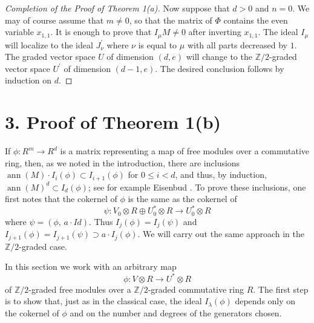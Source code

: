 \documentclass{tran-l}
\theoremstyle{plain}
\theoremstyle{remark}
\theoremstyle{definition}
\newcommand{\ann}{\operatorname{ann}}
\newcommand{\ZZ}{\mathbb {Z}}
\begin{document}
\begin{proof}[Completion of the Proof of Theorem \textup{1(a)}]
Now suppose that $d>0$ and $n=0$. 
We may of course assume that $m\neq 0$,
so that the matrix of 
$\Phi $ contains the even variable $x_{1,1}$.
It is enough to prove that 
$I_{\mu }M\ne 0$ after inverting $x_{1,1}$.
The ideal
$I_{\mu }$ will localize to the ideal
$J^{\prime }_{\nu }$ where $\nu $ is equal to 
$\mu $ with all parts decreased by
$1$.  The graded vector space
$U$ of dimension $(d,e)$ will change to the 
$\ZZ /2$-graded vector space
$U^{\prime }$ of dimension
$(d-1,e)$. The desired conclusion 
follows by induction on $d$.\end{proof}


\section*{3. Proof of Theorem 1(\textup{b})}

If $\phi : R^{m}\to R^{d}$ is a matrix representing a map of free modules
over a commutative ring, then, as we noted in the introduction, there
are 
inclusions  
$\ann(M)\cdot I_{i}(\phi )\subset I_{i+1}(\phi )$ for $0\leq i<d$, and thus, by induction,
$\ann(M)^{d}\subset I_{d}(\phi )$;
see for example Eisenbud \cite{Eis}. 
To
prove these inclusions, one first notes that the cokernel of 
$\phi $ is the same as the cokernel of 
\begin{equation*}\psi :V_{0}\otimes R\oplus U_{0}^{*}\otimes R\rightarrow U_{0}^{*}\otimes R
\end{equation*}
where $\psi =(\phi , \, a\cdot Id )$. Thus $I_{j} (\phi )=I_{j} (\psi )$
and
$I_{j+1}(\phi )=I_{j+1}(\psi )\supset a\cdot I_{j} (\phi )$.
We will carry out the same
approach in the $\ZZ /2$-graded case. 

In this section we work  with an arbitrary map
\begin{equation*}\phi :V\otimes R\rightarrow U^{*}\otimes R
\end{equation*}
of $\ZZ /2$-graded free modules over a $\ZZ /2$-graded commutative ring $R$.
The first step is to show that, just as in the classical case, 
the ideal $I_{\lambda }(\phi )$ depends only on the cokernel of $\phi $ and
on the number and degrees of the generators chosen.
\end{document}
